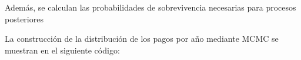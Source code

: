 \documentclass[
]{article}
\newenvironment{Shaded}{\begin{snugshade}}{\end{snugshade}}
\newcommand{\CommentTok}[1]{\textcolor[rgb]{0.56,0.35,0.01}{\textit{#1}}}
\newcommand{\DecValTok}[1]{\textcolor[rgb]{0.00,0.00,0.81}{#1}}
\newcommand{\NormalTok}[1]{#1}
\newcommand{\OtherTok}[1]{\textcolor[rgb]{0.56,0.35,0.01}{#1}}
\newcommand{\SpecialCharTok}[1]{\textcolor[rgb]{0.81,0.36,0.00}{\textbf{#1}}}
\begin{document}
Además, se calculan las probabilidades de sobrevivencia necesarias para
procesos posteriores

\begin{Shaded}
\end{Shaded}

La construcción de la distribución de los pagos por año mediante MCMC se
muestran en el siguiente código:
\end{document}
